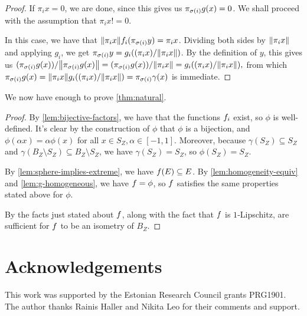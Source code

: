 \documentclass{amsart}
\theoremstyle{definition}
\begin{document}
\begin{proof}
	If $\pi_i x = 0$, we are done, since this gives us
	$\pi_{\sigma(i)} g(x) = 0$. We shall proceed with the assumption that
  $\pi_i x != 0$.

	In this case, we have that
  $\norm{\pi_i x}f_i (\pi_{\sigma(i)} y) = \pi_i x$.
	Dividing both sides by $\norm{\pi_i x}$ and applying $g_i$, we get
	$\pi_{\sigma(i)} y = g_i ((\pi_i x)/\norm{\pi_i x})$.
	By the definition of $y$, this gives us
  $ (\pi_{\sigma(i)} g(x))/\norm{\pi_{\sigma(i)} g(x)} = (\pi_{\sigma(i)} g(x))/\norm{\pi_i x} = g_i ((\pi_i x)/\norm{\pi_i x}), $
	from which
	$\pi_{\sigma(i)} g(x) = \norm{\pi_i x}g_i ((\pi_i x)/\norm{\pi_i x}) = \pi_{\sigma(i)} \gamma(x)$
	is immediate.
\end{proof}

We now have enough to prove \autoref{thm:natural}.

\begin{proof} 

  By \autoref{lem:bijective-factors}, we have that the functions $f_i$ exist,
  so $\phi$ is well-defined.
  It's clear by the construction of $\phi$ that $\phi$ is a bijection, and $\phi(\alpha x) = \alpha \phi(x)$
  for all $x \in S_Z, \alpha \in [-1,1]$. Moreover, because $\gamma(S_Z) \subseteq S_Z$ and $\gamma(B_Z\setminus S_Z) \subseteq B_Z \setminus S_Z$, we have $\gamma(S_Z) = S_Z$, so $\phi(S_Z) = S_Z$.

  

  By \autoref{lem:sphere-implies-extreme}, we have $f(E) \subseteq E$.
  By \autoref{lem:homogeneity-equiv} and \autoref{lem:g-homogeneous}, we have $f = \phi$,
  so $f$ satisfies the same properties stated above for $\phi$.

By \autocite[Lemma 2.5]{cascales:2016}
  the facts just stated about $f$, along with the fact that $f$ is $1$‑Lipschitz, are sufficient for $f$ to be an isometry of $B_Z$.
\end{proof}


\section*{Acknowledgements}

This work was supported by the Estonian Research Council grants PRG1901. The author thanks Rainis Haller and Nikita Leo for their comments and support.


\printbibliography
\end{document}
